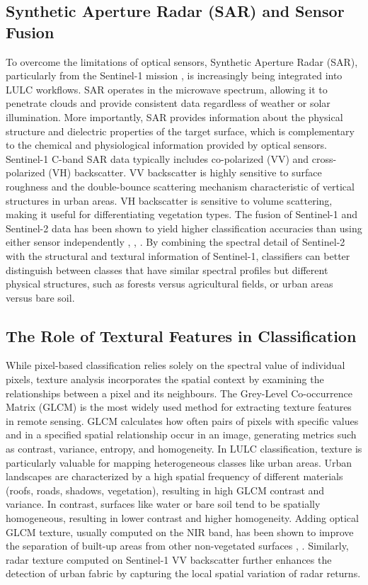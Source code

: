 \documentclass[conference]{IEEEtran}
\begin{document}
\subsection{Synthetic Aperture Radar (SAR) and Sensor Fusion}
To overcome the limitations of optical sensors, Synthetic Aperture Radar (SAR), particularly from the Sentinel-1 mission \cite{r6}, is increasingly being integrated into LULC workflows. SAR operates in the microwave spectrum, allowing it to penetrate clouds and provide consistent data regardless of weather or solar illumination.
More importantly, SAR provides information about the physical structure and dielectric properties of the target surface, which is complementary to the chemical and physiological information provided by optical sensors. Sentinel-1 C-band SAR data typically includes co-polarized (VV) and cross-polarized (VH) backscatter. VV backscatter is highly sensitive to surface roughness and the double-bounce scattering mechanism characteristic of vertical structures in urban areas. VH backscatter is sensitive to volume scattering, making it useful for differentiating vegetation types.
The fusion of Sentinel-1 and Sentinel-2 data has been shown to yield higher classification accuracies than using either sensor independently \cite{r3}, \cite{r14}, \cite{r16}. By combining the spectral detail of Sentinel-2 with the structural and textural information of Sentinel-1, classifiers can better distinguish between classes that have similar spectral profiles but different physical structures, such as forests versus agricultural fields, or urban areas versus bare soil.

\subsection{The Role of Textural Features in Classification}
While pixel-based classification relies solely on the spectral value of individual pixels, texture analysis incorporates the spatial context by examining the relationships between a pixel and its neighbours. The Grey-Level Co-occurrence Matrix (GLCM) \cite{r20} is the most widely used method for extracting texture features in remote sensing.
GLCM calculates how often pairs of pixels with specific values and in a specified spatial relationship occur in an image, generating metrics such as contrast, variance, entropy, and homogeneity. In LULC classification, texture is particularly valuable for mapping heterogeneous classes like urban areas. Urban landscapes are characterized by a high spatial frequency of different materials (roofs, roads, shadows, vegetation), resulting in high GLCM contrast and variance. In contrast, surfaces like water or bare soil tend to be spatially homogeneous, resulting in lower contrast and higher homogeneity.
Adding optical GLCM texture, usually computed on the NIR band, has been shown to improve the separation of built-up areas from other non-vegetated surfaces \cite{r8}, \cite{r20}. Similarly, radar texture computed on Sentinel-1 VV backscatter further enhances the detection of urban fabric by capturing the local spatial variation of radar returns.
\end{document}
